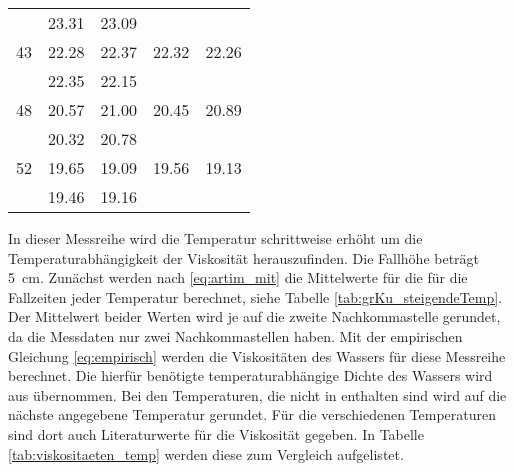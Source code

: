 \begin{table}[H]
\begin{tabular}{S[table-format=2.0] S[table-format=2.2] S  S  S }
               & 23.31 &  23.09 &           &           \\
            43 & 22.28 &  22.37 &   22.32   &  22.26    \\
               & 22.35 &  22.15 &           &           \\
            48 & 20.57 &  21.00 &   20.45   &  20.89    \\
               & 20.32 &  20.78 &           &           \\
            52 & 19.65 &  19.09 &   19.56   &  19.13    \\
               & 19.46 &  19.16 &           &           \\
        \bottomrule  
    \end{tabular}
\end{table}
In dieser Messreihe wird die Temperatur schrittweise erhöht um die Temperaturabhängigkeit der Viskosität herauszufinden.
Die Fallhöhe beträgt \qty[]{5}{\cm}.
Zunächst werden nach \eqref{eq:artim_mit} die Mittelwerte für die für die Fallzeiten jeder Temperatur berechnet,
siehe Tabelle \ref{tab:grKu_steigendeTemp}.
Der Mittelwert beider Werten wird je auf die zweite Nachkommastelle gerundet,
da die Messdaten nur zwei Nachkommastellen haben.
Mit der empirischen Gleichung \eqref{eq:empirisch} werden die Viskositäten des Wassers für diese Messreihe berechnet.
Die hierfür benötigte temperaturabhängige Dichte des Wassers wird aus \cite[][290]{geschke} übernommen. 
Bei den Temperaturen, die nicht in \cite[][290]{geschke} enthalten sind wird auf die nächste angegebene Temperatur gerundet.
Für die verschiedenen Temperaturen sind dort auch Literaturwerte für die Viskosität gegeben. 
In Tabelle \ref{tab:viskositaeten_temp} werden diese zum Vergleich aufgelistet.
%

